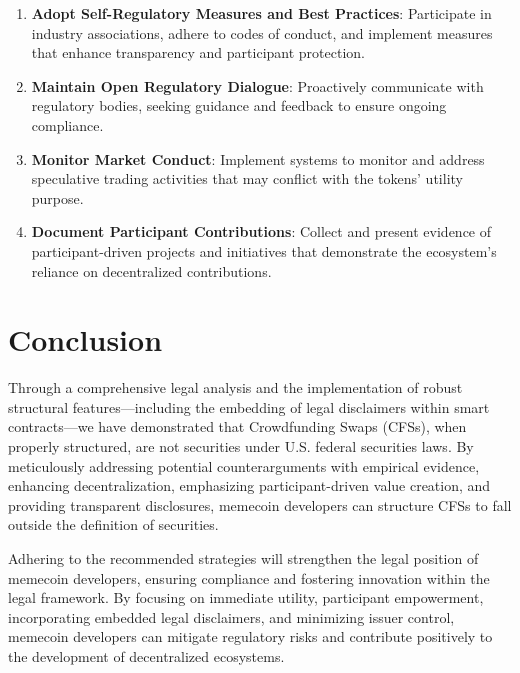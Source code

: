 \documentclass[a4paper,12pt]{article}
\begin{document}
\begin{enumerate}[label=\arabic*)]
 \item \textbf{Adopt Self-Regulatory Measures and Best Practices}: Participate in industry associations, adhere to codes of conduct, and implement measures that enhance transparency and participant protection.
 \item \textbf{Maintain Open Regulatory Dialogue}: Proactively communicate with regulatory bodies, seeking guidance and feedback to ensure ongoing compliance.
 \item \textbf{Monitor Market Conduct}: Implement systems to monitor and address speculative trading activities that may conflict with the tokens' utility purpose.
 \item \textbf{Document Participant Contributions}: Collect and present evidence of participant-driven projects and initiatives that demonstrate the ecosystem's reliance on decentralized contributions.
\end{enumerate}

\section{Conclusion}
Through a comprehensive legal analysis and the implementation of robust structural features—including the embedding of legal disclaimers within smart contracts—we have demonstrated that Crowdfunding Swaps (CFSs), when properly structured, are not securities under U.S. federal securities laws. By meticulously addressing potential counterarguments with empirical evidence, enhancing decentralization, emphasizing participant-driven value creation, and providing transparent disclosures, memecoin developers can structure CFSs to fall outside the definition of securities.

Adhering to the recommended strategies will strengthen the legal position of memecoin developers, ensuring compliance and fostering innovation within the legal framework. By focusing on immediate utility, participant empowerment, incorporating embedded legal disclaimers, and minimizing issuer control, memecoin developers can mitigate regulatory risks and contribute positively to the development of decentralized ecosystems.
\end{document}
